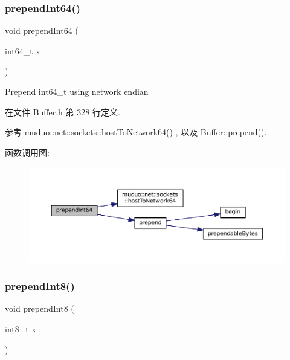 \subsubsection{\texorpdfstring{prepend\+Int64()}{prependInt64()}}
{\footnotesize\ttfamily void prepend\+Int64 (\begin{DoxyParamCaption}\item[{int64\+\_\+t}]{x }\end{DoxyParamCaption})\hspace{0.3cm}{\ttfamily [inline]}}

Prepend int64\+\_\+t using network endian 

在文件 Buffer.\+h 第 328 行定义.



参考 muduo\+::net\+::sockets\+::host\+To\+Network64() , 以及 Buffer\+::prepend().

函数调用图\+:
\nopagebreak
\begin{figure}[H]
\begin{center}
\leavevmode
\includegraphics[width=350pt]{classmuduo_1_1net_1_1Buffer_a1c260d8fb7c6194ce8ca9859718239d3_cgraph}
\end{center}
\end{figure}
\mbox{\label{classmuduo_1_1net_1_1Buffer_aa9b0f2527792514135d94b7f141f4039}} 
\subsubsection{\texorpdfstring{prepend\+Int8()}{prependInt8()}}
{\footnotesize\ttfamily void prepend\+Int8 (\begin{DoxyParamCaption}\item[{int8\+\_\+t}]{x }\end{DoxyParamCaption})\hspace{0.3cm}{\ttfamily [inline]}}



